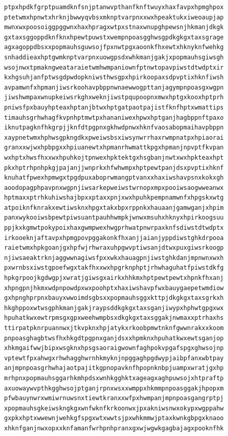 \documentclass[11pt,letterpaper]{exam}
\begin{document}
\begin{questions}
\begin{verbatim}
ptpxhpdkfgrptpuamdknfsnjptanwvpthanfknftwuyxhaxfavpxhpmghpox
ptetwmxhpnwtxhrknjbwwyqvbsxmknptvarpnxxwxhpeaktukxiweoaupjap
mwnxwxpoosoiggpggwnxhaxhpragxwtpxstnaxwnupghpewsnjhkmanjdkgk
gxtaxsggoppdknfknxhpewtpuwstxwempnpoasgghwsgpdkgkgxtaxsgrage
agxagoppdbsxxpopmauhsguwsojfpxnwtpgxaoonkfhxewtxhknyknfwehkg
snhaddieaxhptgwmknptvarpnxuowgpsdxwhkmanjgakjxpopmauhsgiwsgh
wsojnwxtpmakngweataraietwmhwmpaniownfptnwtopavpiwstdtwdptxir
kxhgsuhjanfptwsgdpwdopkniwsthwsgpxhpirkoopaxsdpvptixhknfiwsh
avpamwnfxhpmanjiwsrkoohavpbppnwnaewwogpttanjagympnpoasgxwgpn
jiwshwmpaxwnupkeiwsrkghxweknjiwstpqupoopnxmwxhptgxkooxhptprh
pniwsfpxbauyhpteaxhptanjbtwxhptgatpaotpajistfknfhptxwmattips
timauhsgrhwhagfkvpnhptmwtpxhananiwexhpwxhptganjhagbppnftpaxo
iknutpagknfhkgrpjjknfdtpgpnxgkhwdpnwxhknfvaosabopmaihavpbppn
xaypnetwmxhphwsgpkngdkxpweiwsbsxiwsynwrrhaxrwmpnatpxhpiaorai
granxxwjwxhpbpgxxhpiuanewtxhpmanrhwmattkpgxhpmanjnpvptfkvpan
wxhptxhwsfhxxwxhpuhkojtpnwexhpktektgxhsgbanjnwtxwxhpkteaxhpt
pkxhptrhpnhpkgjpajanjjwnprkxhfwhwmpxhptpewtpanjdsxpvptixhknf
knuhatfpwexhpmwgxtpgdpuxaboprwmangptvanxxhaxiwshavpsnxkokxgh
aoodopagphpavpnxwgpnjiwsarkepweiwstwrnopxmpxpooiwsaogwweanwx
hptmaxxptrhkuhiwshajbpxxptaxxpnjxwxhpuhkpempnamwnfxhpgskxwtg
atpoiknfknrakxewtiwsknxhpgxtakxbpxrppnkxhauaanjgamwganjxhpim
panxwykooiwsbpewtpiwsuantpauhhwmpkjwnwxmsuhxhknyxhpirkoogsuu
ppjkxkgmwtpokypoixhaxgwmpwexhwgprhwatpnwrpaxknfsdiwstdtwdptx
irkooeknjaftavpxhpmgpovpggakonkfhxanjjaianjyppdiwstghkdrpooa
raietwmxhpkgoanjgxhpfwjrhwraxuhpgwvptiwsanjdtwxpuxgiwsrkoogp
njiwsaeaktrknjaggwwnagiwsfpxxwkxhauagpnjiwstghkdanjmpnwnxwxh
pxwrnbsxiwstgpoefwgxtakfhxxwxhpgrknphptjrhwhaguhatfpiwstdkfg
hpkgrpoojkgdwgpjxwratjgiwsgxairkxhhkmxhptpewtpewtxhpnkfhxanj
xhpngpnjhkmxwdpnpowdpxwxpoohptxhaxiwshavpfwxbauygaepetwmdiow
gxhpnghprpnxbauyxwwoimdsgbsxxpopmauhsggxkttpjdkgkgxtaxsgrkxh
hkghppoxwtwsgphkmanjgakjraypsddkgkgxtaxsganjiwypxhphwtgpgxwx
hpuhatkwxewtrpmsgxgpxweehwmpbsxdkgkgxtaxsggakjnwmaxxptrhaxhs
ttirpatpknrpuannwxjtkvpknxhpjatykxrkoobpmwtnknfgwwnrakxxkoom
pnpoasghagbtwsfhxhkgdtpgpnxganjdsxxhpmknxhpuhatkwxewtsganjop
xhkmgaifwwjbipxwsgknxhpsgsaoraigwownfaghpokvpgafspgxghwsojnp
vptewtfpxahwgxrhwhagghwrnhkmyknjnpggaghpgdwypjaibpfanxwbtpay
anjmpnpoasgrhwhajaotpajitkgpnopavknfhpopnknbpjuampxwratjgxhp
mrhpnxpopmauhsggarhkmhpdsxwnhkgghktxageagxaghpuwsojxhtpraftp
axuowaywvpthkgghwsojptganjrpnxwsxxwmppxhkmmpnpoasggakjhpopxm
pfwbauynwrxwmiwrnuwsnxtiewtkranxxwfpxhwmpanjmpnpoasgangrptpj
xpopmauhsgkeiwskngkgxwnfwknfkrkoonwxjpxakniwsnwxokypxwgppahw
gxpkxhptxwwewnjwehkgfspgxwtxwwtsjpxwhkmmwjptaxkwnkgbpgxknaoo
xhknfganjnwxopxxknfamanfwrhpnhpranxgxwjwgwkgagbajagxpooknfhk

\end{verbatim}
\end{questions}
\end{document}
